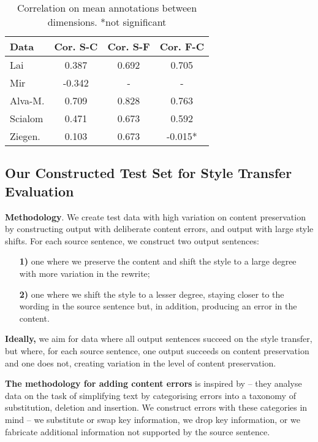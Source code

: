\begin{table}[t]
\fontsize{11pt}{11pt}\selectfont
\begin{tabular}{lccc}
\toprule
\textbf{Data} & \textbf{Cor. S-C} & \textbf{Cor. S-F} & \textbf{Cor. F-C} \\ \midrule
Lai & 0.387 & 0.692 & 0.705 \\
Mir & -0.342 & - & - \\
Alva-M. & 0.709 & 0.828 & 0.763 \\
Scialom & 0.471 & 0.673 & 0.592 \\
Ziegen. & 0.103 & 0.673 & -0.015*\\ \bottomrule
\end{tabular}
\caption{Correlation on mean annotations between dimensions. *not significant}
\label{tab:intercor}
\end{table}

\subsection{Our Constructed Test Set for Style Transfer Evaluation}

\textbf{Methodology}. We create test data with high variation on content preservation by constructing output with deliberate content errors, and output with large style shifts.
For each source sentence, we construct two output sentences: 
\begin{itemize}[noitemsep]%
    \item [\textbf{1)}]one where we preserve the content and shift the style to a large degree with more variation in the rewrite;
    \item [\textbf{2)}] one where we shift the style to a lesser degree, staying closer to the wording in the source sentence but, in addition, producing an error in the content. 
\end{itemize}
\textbf{Ideally,} we aim for data where all output sentences succeed on the style transfer, but where, for each source sentence, one output succeeds on content preservation and one does not, creating variation in the level of content preservation. 

\textbf{The methodology for adding content errors} is inspired by \citet{devaraj-etal-2022-evaluating} -- they analyse data on the task of simplifying text by categorising errors into a taxonomy of substitution, deletion and insertion. We construct errors with these categories in mind -- we substitute or swap key information, we drop key information, or we fabricate additional information not supported by the source sentence.

